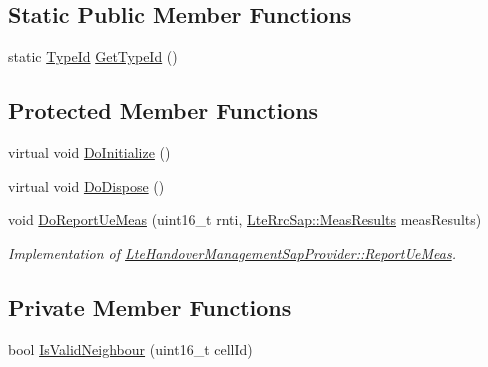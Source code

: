 \subsection*{Static Public Member Functions}
\begin{DoxyCompactItemize}
\item 
static \hyperlink{classns3_1_1TypeId}{Type\+Id} \hyperlink{classns3_1_1A3RsrpHandoverAlgorithm_a360823d5e9ad02bb52aa7cb15b54c582}{Get\+Type\+Id} ()
\end{DoxyCompactItemize}
\subsection*{Protected Member Functions}
\begin{DoxyCompactItemize}
\item 
virtual void \hyperlink{classns3_1_1A3RsrpHandoverAlgorithm_a0752740942ee94b67c99402ec3bccfe7}{Do\+Initialize} ()
\item 
virtual void \hyperlink{classns3_1_1A3RsrpHandoverAlgorithm_a938f01d137e22ebec37bd6c65eaaeb9a}{Do\+Dispose} ()
\item 
void \hyperlink{classns3_1_1A3RsrpHandoverAlgorithm_a985a69ab65c89a4c999af84fcfb7e391}{Do\+Report\+Ue\+Meas} (uint16\+\_\+t rnti, \hyperlink{structns3_1_1LteRrcSap_1_1MeasResults}{Lte\+Rrc\+Sap\+::\+Meas\+Results} meas\+Results)
\begin{DoxyCompactList}\small\item\em Implementation of \hyperlink{classns3_1_1LteHandoverManagementSapProvider_a5daca6a055e4f8794f7f1e8ba1077b15}{Lte\+Handover\+Management\+Sap\+Provider\+::\+Report\+Ue\+Meas}. \end{DoxyCompactList}\end{DoxyCompactItemize}
\subsection*{Private Member Functions}
\begin{DoxyCompactItemize}
\item 
bool \hyperlink{classns3_1_1A3RsrpHandoverAlgorithm_a09211bfb353fb6ef9df7b379a0a63fd3}{Is\+Valid\+Neighbour} (uint16\+\_\+t cell\+Id)
\end{DoxyCompactItemize}
